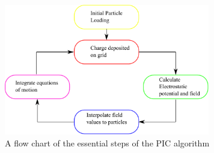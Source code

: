 




\begin{figure}[H]
\centering
\includegraphics[width=0.8\textwidth]{piccycle.pdf}
\caption{A flow chart of the essential steps of the PIC algorithm }
\label{fig:piccycle}
\end{figure}


